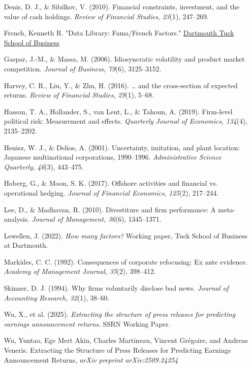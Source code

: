 \documentclass{article}
\begin{document}
Denis, D. J., \& Sibilkov, V. (2010). Financial constraints, investment,
and the value of cash holdings. \emph{Review of Financial Studies,
23}(1), 247--269.

French, Kenneth R. "Data Library: Fama/French Factors."
\href{https://mba.tuck.dartmouth.edu/pages/faculty/ken.french/Data_Library/f-f_factors.html}{Dartmouth Tuck School of Business}

Gaspar, J.-M., \& Massa, M. (2006). Idiosyncratic volatility and product
market competition. \emph{Journal of Business, 79}(6), 3125--3152.

Harvey, C. R., Liu, Y., \& Zhu, H. (2016). \ldots{} and the
cross-section of expected returns. \emph{Review of Financial Studies,
29}(1), 5--68.

Hassan, T. A., Hollander, S., van Lent, L., \& Tahoun, A. (2019).
Firm-level political risk: Measurement and effects. \emph{Quarterly
Journal of Economics, 134}(4), 2135--2202.

Henisz, W. J., \& Delios, A. (2001). Uncertainty, imitation, and plant
location: Japanese multinational corporations, 1990--1996.
\emph{Administrative Science Quarterly, 46}(3), 443--475.

Hoberg, G., \& Moon, S. K. (2017). Offshore activities and financial vs.
operational hedging. \emph{Journal of Financial Economics, 125}(2),
217--244.

Lee, D., \& Madhavan, R. (2010). Divestiture and firm performance: A
meta-analysis. \emph{Journal of Management, 36}(6), 1345--1371.

Lewellen, J. (2022). \emph{How many factors?} Working paper, Tuck School
of Business at Dartmouth.

Markides, C. C. (1992). Consequences of corporate refocusing: Ex ante
evidence. \emph{Academy of Management Journal, 35}(2), 398--412.

Skinner, D. J. (1994). Why firms voluntarily disclose bad news.
\emph{Journal of Accounting Research, 32}(1), 38--60.

Wu, X., et al. (2025). \emph{Extracting the structure of press releases
for predicting earnings announcement returns}. SSRN Working Paper.

Wu, Yuntao, Ege Mert Akin, Charles Martineau, Vincent Grégoire, and
Andreas Veneris. Extracting the Structure of Press Releases for
Predicting Earnings Announcement Returns, \emph{arXiv preprint
arXiv:2509.24254}
\end{document}
